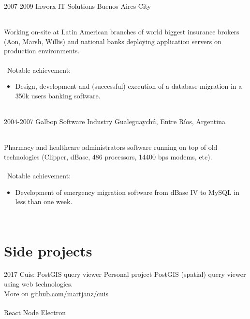\documentclass[]{cv-style}          %
\begin{document}
\begin{entrylist}
\entry
  {2007-2009}
  {Inworx IT Solutions}
  {Buenos Aires City}
  {\\
  Working on-site at Latin American branches of world biggest insurance brokers 
  (Aon, Marsh, Willis) and national banks deploying application servers on 
  production environments.\\\
  \\\
  Notable achievement:
  \begin{itemize}
    \item Design, development and (successful) execution of a database migration 
    in a 350k users banking software.
  \end{itemize}
}\\
\entry
  {2004-2007}
  {Galbop Software Industry}
  {Gualeguaychú, Entre Ríos, Argentina}
  {\\
  Pharmacy and healthcare administrators software running on top of old technologies 
  (Clipper, dBase, 486 processors, 14400 bps modems, etc).\\
  \\\
  Notable achievement:
  \begin{itemize}
  	\item Development of emergency migration software from dBase IV to MySQL in less than one week.
  \end{itemize}
}
\end{entrylist}
\\

\section{Side projects}

\begin{entrylist}
\entry
{2017}
{Cuis: PostGIS query viewer}
{Personal project}
{PostGIS (spatial) query viewer using web technologies.\\
More on \href{https://github.com/martjanz/cuis}{github.com/martjanz/cuis}\\
\\
React \textbullet{} Node \textbullet{} Electron\\

}
{\vspace{-0.3cm}}
\end{entrylist}
\end{document}
